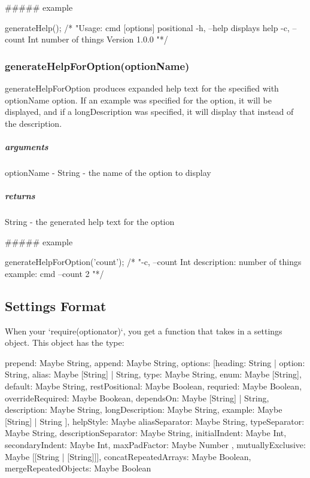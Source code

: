 \#\#\#\#\# example 
\begin{DoxyCode}
generateHelp(); \textcolor{comment}{/*}
\textcolor{comment}{"Usage: cmd [options] positional}
\textcolor{comment}{}
\textcolor{comment}{  -h, --help       displays help}
\textcolor{comment}{  -c, --count Int  number of things}
\textcolor{comment}{}
\textcolor{comment}{Version  1.0.0}
\textcolor{comment}{"*/}
\end{DoxyCode}


\subsubsection*{generate\+Help\+For\+Option(option\+Name)}

{\ttfamily generate\+Help\+For\+Option} produces expanded help text for the specified with {\ttfamily option\+Name} option. If an {\ttfamily example} was specified for the option, it will be displayed, and if a {\ttfamily long\+Description} was specified, it will display that instead of the {\ttfamily description}.

\subparagraph*{arguments}


\begin{DoxyItemize}
\item option\+Name -\/ {\ttfamily String} -\/ the name of the option to display
\end{DoxyItemize}

\subparagraph*{returns}

{\ttfamily String} -\/ the generated help text for the option

\#\#\#\#\# example 
\begin{DoxyCode}
generateHelpForOption(\textcolor{stringliteral}{'count'}); \textcolor{comment}{/*}
\textcolor{comment}{"-c, --count Int}
\textcolor{comment}{description: number of things}
\textcolor{comment}{example: cmd --count 2}
\textcolor{comment}{"*/}
\end{DoxyCode}


\subsection*{Settings Format}

When your `require(\textquotesingle{}optionator\textquotesingle{})`, you get a function that takes in a settings object. This object has the type\+: \begin{DoxyVerb}{
  prepend: Maybe String,
  append: Maybe String,
  options: [{heading: String} | {
    option: String,
    alias: Maybe [String] | String,
    type: Maybe String,
    enum: Maybe [String],
    default: Maybe String,
    restPositional: Maybe Boolean,
    requried: Maybe Boolean,
    overrideRequired: Maybe Bookean,
    dependsOn: Maybe [String] | String,
    description: Maybe String,
    longDescription: Maybe String,
    example: Maybe [String] | String
  }],
  helpStyle: Maybe {
    aliasSeparator: Maybe String,
    typeSeparator: Maybe String,
    descriptionSeparator: Maybe String,
    initialIndent: Maybe Int,
    secondaryIndent: Maybe Int,
    maxPadFactor: Maybe Number
  },
  mutuallyExclusive: Maybe [[String | [String]]],
  concatRepeatedArrays: Maybe Boolean,
  mergeRepeatedObjects: Maybe Boolean
}
\end{DoxyVerb}



